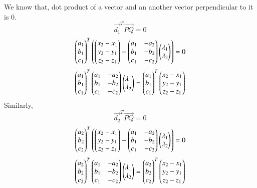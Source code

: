 \documentclass[journal,12pt,twocolumn]{IEEEtran}
\begin{document}
We know that, dot product of a vector and an another vector perpendicular to it is $0$.
\begin{equation}
    \vec{d_1}^T\vec{PQ} = 0
\end{equation}
\begin{equation}
    \begin{pmatrix}a_1\\b_1\\c_1\end{pmatrix}^T\left(\begin{pmatrix}x_2 - x_1\\y_2 - y_1\\z_2 - z_1\end{pmatrix} - \begin{pmatrix}a_1 & -a_2\\b_1 & -b_2\\c_1 & -c_2\end{pmatrix}\begin{pmatrix}\lambda{_1} \\\lambda{_2}\end{pmatrix}\right) = 0
\end{equation}
\begin{equation}\label{eq1}
    \begin{pmatrix}a_1\\b_1\\c_1\end{pmatrix}^T\begin{pmatrix}a_1 & -a_2\\b_1 & -b_2\\c_1 & -c_2\end{pmatrix}\begin{pmatrix}\lambda{_1}\\\lambda{_2}\end{pmatrix} = \begin{pmatrix}a_1\\b_1\\c_1\end{pmatrix}^T\begin{pmatrix}x_2 - x_1\\y_2 - y_1\\z_2 - z_1\end{pmatrix}
\end{equation}
Similarly,\\
\begin{equation}
    \vec{d_2}^T\vec{PQ} = 0
\end{equation}
\begin{equation}
    \begin{pmatrix}a_2\\b_2\\c_2\end{pmatrix}^T\left(\begin{pmatrix}x_2 - x_1\\y_2 - y_1\\z_2 - z_1\end{pmatrix} - \begin{pmatrix}a_1 & -a_2\\b_1 & -b_2\\c_1 & -c_2\end{pmatrix}\begin{pmatrix}\lambda{_1} \\\lambda{_2}\end{pmatrix}\right) = 0
\end{equation}
\begin{equation}\label{eq2}
    \begin{pmatrix}a_2\\b_2\\c_2\end{pmatrix}^T\begin{pmatrix}a_1 & -a_2\\b_1 & -b_2\\c_1 & -c_2\end{pmatrix}\begin{pmatrix}\lambda{_1}\\\lambda{_2}\end{pmatrix} = \begin{pmatrix}a_2\\b_2\\c_2\end{pmatrix}^T\begin{pmatrix}x_2 - x_1\\y_2 - y_1\\z_2 - z_1\end{pmatrix}
\end{equation}
\end{document}
